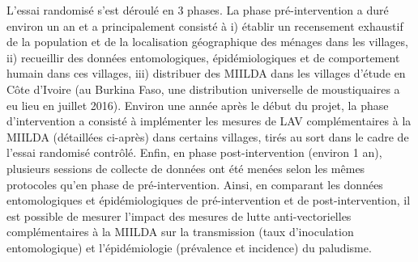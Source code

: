 \documentclass[12pt,twoside]{reedthesis}
\begin{document}
L'essai randomisé s'est déroulé en 3 phases. La phase pré-intervention a duré environ un an et a principalement consisté à i) établir un recensement exhaustif de la population et de la localisation géographique des ménages dans les villages, ii) recueillir des données entomologiques, épidémiologiques et de comportement humain dans ces villages, iii) distribuer des MIILDA dans les villages d'étude en Côte d'Ivoire (au Burkina Faso, une distribution universelle de moustiquaires a eu lieu en juillet 2016). Environ une année après le début du projet, la phase d'intervention a consisté à implémenter les mesures de LAV complémentaires à la MIILDA (détaillées ci-après) dans certains villages, tirés au sort dans le cadre de l'essai randomisé contrôlé. Enfin, en phase post-intervention (environ 1 an), plusieurs sessions de collecte de données ont été menées selon les mêmes protocoles qu'en phase de pré-intervention. Ainsi, en comparant les données entomologiques et épidémiologiques de pré-intervention et de post-intervention, il est possible de mesurer l'impact des mesures de lutte anti-vectorielles complémentaires à la MIILDA sur la transmission (taux d'inoculation entomologique) et l'épidémiologie (prévalence et incidence) du paludisme.\\
\end{document}
